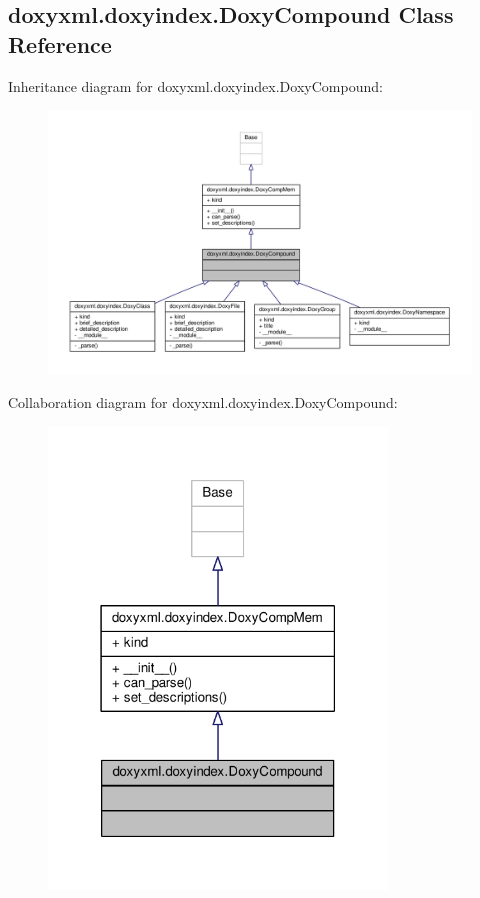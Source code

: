 \subsection{doxyxml.\+doxyindex.\+Doxy\+Compound Class Reference}
\label{classdoxyxml_1_1doxyindex_1_1DoxyCompound}


Inheritance diagram for doxyxml.\+doxyindex.\+Doxy\+Compound\+:
\nopagebreak
\begin{figure}[H]
\begin{center}
\leavevmode
\includegraphics[width=350pt]{d6/d67/classdoxyxml_1_1doxyindex_1_1DoxyCompound__inherit__graph}
\end{center}
\end{figure}


Collaboration diagram for doxyxml.\+doxyindex.\+Doxy\+Compound\+:
\nopagebreak
\begin{figure}[H]
\begin{center}
\leavevmode
\includegraphics[width=255pt]{d7/db6/classdoxyxml_1_1doxyindex_1_1DoxyCompound__coll__graph}
\end{center}
\end{figure}
